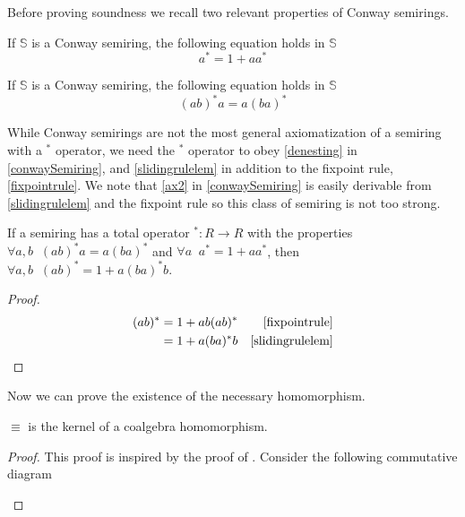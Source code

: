 \documentclass[a4paper,UKenglish,cleveref, autoref, thm-restate]{lipics-v2021}
\newcommand{\Exp}{\textbf{\upshape{Exp}}}
\theoremstyle{plain}\newtheoremrep{thm}{Theorem}[section]
\begin{document}
\begin{toappendix}
		Before proving soundness we recall two relevant properties of Conway semirings.
		\begin{lem} \label{fixpointrule}
			If $\mathbb S$ is a Conway semiring, the following equation holds in $\mathbb S$
			$$
				a^* = 1+aa^*
			$$ 
		\end{lem}
		\begin{lem} \label{slidingrulelem}
			If $\mathbb S$ is a Conway semiring, the following equation holds in $\mathbb S$
			$$
				(ab)^*a = a(ba)^*
			$$
		\end{lem}
		
		While Conway semirings are not the most general axiomatization of a semiring with a $^*$ operator, we need the $^*$ operator to obey \cref{denesting} in \cref{conwaySemiring}, and \cref{slidingrulelem} in addition to the fixpoint rule, \cref{fixpointrule}. We note that \ref{ax2} in \cref{conwaySemiring} is easily derivable from \cref{slidingrulelem} and the fixpoint rule so this class of semiring is not too strong.
		\begin{lem}
			If a semiring has a total operator $^*:R \to R$ with the properties $\forall a,b\;\; (ab)^*a = a(ba)^*$ and $\forall a\;\; a^* = 1+aa^*$, then $\forall a,b\;\; (ab)^* = 1+a(ba)^*b$.
		\end{lem}
		\begin{proof}
			\begin{align*}
				(ab)^* &= 1+ab(ab)^* & \cref{fixpointrule}\\
				&= 1+a(ba)^*b & \cref{slidingrulelem}\rlap{\qedhere} 
			\end{align*}
		\end{proof}
		Now we can prove the existence of the necessary homomorphism.
		\begin{lem}
			$\equiv$ is the kernel of a coalgebra homomorphism.\label{SoundnessMorphism}
		\end{lem}
		\begin{proof}
			This proof is inspired by the proof of \cite[lemma 4.4.3]{ToddThesis}. Consider the following commutative diagram
			\begin{center}\end{center}
			

\end{proof}
\end{toappendix}
\end{document}
